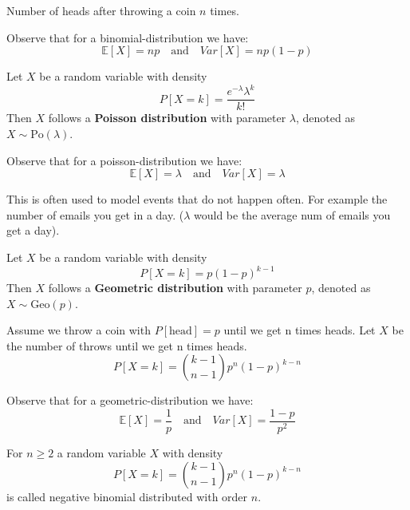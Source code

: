 \begin{example}
	Number of heads after throwing a coin $n$ times.
\end{example}

\begin{remark}
	Observe that for a binomial-distribution we have:
	$$\mathbb{E}[X] = np \quad \text{and} \quad Var[X] = np(1-p)$$
\end{remark}

\begin{definition}
	Let $X$ be a random variable with density
	$$P[X=k] = \frac{e^{-\lambda} \lambda^k}{k!}$$
	Then $X$ follows a \textbf{Poisson distribution} with parameter $\lambda$, denoted as $X \sim \text{Po}(\lambda)$.
\end{definition}

\begin{remark}
	Observe that for a poisson-distribution we have:
	$$\mathbb{E}[X] = \lambda \quad \text{and} \quad Var[X] = \lambda$$
\end{remark}

\begin{remark}
	This is often used to model events that do not happen often. For example the number of emails you get in a day. ($\lambda$ would be the average num of emails you get a day).
\end{remark}

\begin{definition}
	Let $X$ be a random variable with density
	$$P[X=k] = p(1-p)^{k-1}$$
	Then $X$ follows a \textbf{Geometric distribution} with parameter $p$, denoted as $X \sim \text{Geo}(p)$.
\end{definition}

\begin{example}
	Assume we throw a coin with $P[\text{head}] = p$ until we get n times heads. Let $X$ be the number of throws until we get n times heads.
	$$P[X=k] = \binom{k-1}{n-1} p^n (1-p)^{k-n}$$
\end{example}

\begin{remark}
	Observe that for a geometric-distribution we have:
	$$\mathbb{E}[X] = \frac{1}{p} \quad \text{and} \quad Var[X] = \frac{1-p}{p^2}$$
\end{remark}

\begin{definition}
	For $n \geq 2$ a random variable $X$ with density
	$$P[X=k] = \binom{k-1}{n-1} p^n (1-p)^{k-n}$$
	is called negative binomial distributed with order $n$.
\end{definition}

